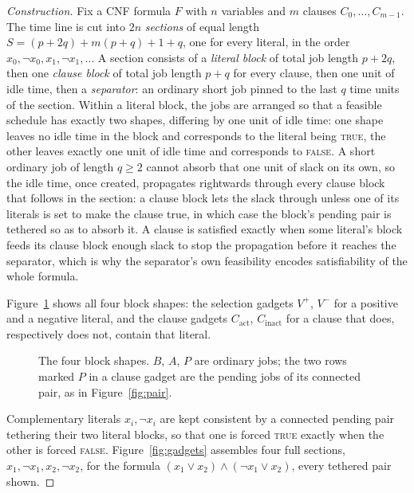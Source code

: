 \documentclass[11pt,a4paper]{article}
\theoremstyle{definition}
\begin{document}
\begin{proof}[Construction]
Fix a CNF formula $F$ with $n$ variables and $m$ clauses
$C_0,\dots,C_{m-1}$. The time line is cut into $2n$ \emph{sections} of equal
length $S=(p+2q)+m(p+q)+1+q$, one for every literal, in the order
$x_0,\neg x_0,x_1,\neg x_1,\dots$ A section consists of a \emph{literal
block} of total job length $p+2q$, then one \emph{clause block} of total job
length $p+q$ for every clause, then one unit of idle time, then a
\emph{separator}: an ordinary short job pinned to the last $q$ time units of
the section.
Within a literal block, the jobs are arranged so that a feasible schedule has
exactly two shapes, differing by one unit of idle time: one shape leaves no
idle time in the block and corresponds to the literal being \textsc{true}, the
other leaves exactly one unit of idle time and corresponds to \textsc{false}.
A short ordinary job of length $q\ge 2$ cannot absorb that one unit of slack
on its own, so the idle time, once created, propagates rightwards through
every clause block that follows in the section: a clause block lets the slack
through unless one of its literals is set to make the clause true, in which
case the block's pending pair is tethered so as to absorb it. A clause is
satisfied exactly when some literal's block feeds its clause block enough
slack to stop the propagation before it reaches the separator, which is why
the separator's own feasibility encodes satisfiability of the whole formula.

Figure~\ref{fig:blocks} shows all four block shapes: the selection gadgets $V^+$,
$V^-$ for a positive and a negative literal, and the clause gadgets
$C_{\text{act}}$, $C_{\text{inact}}$ for a clause that does, respectively
does not, contain that literal.

\begin{figure}[ht]
\centering

\caption{The four block shapes. $B$, $A$, $P$ are ordinary jobs; the two
rows marked $P$ in a clause gadget are the pending jobs of its connected
pair, as in Figure~\ref{fig:pair}.}
\label{fig:blocks}
\end{figure}

Complementary literals $x_i,\neg x_i$ are kept consistent by a connected
pending pair tethering their two literal blocks, so that one is forced
\textsc{true} exactly when the other is forced \textsc{false}.
Figure~\ref{fig:gadgets} assembles four full sections, $x_1,\neg x_1,x_2,\neg
x_2$, for the formula $(x_1\lor x_2)\land(\neg x_1\lor x_2)$, every
tethered pair shown.


\end{proof}
\end{document}
